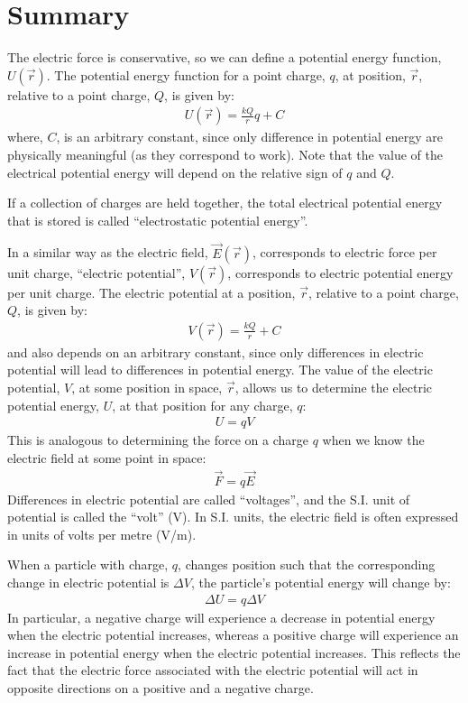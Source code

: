 \newpage
\section{Summary}

\begin{chapterSummary}
The electric force is conservative, so we can define a potential energy function, $U(\vec r)$. The potential energy function for a point charge, $q$, at position, $\vec r$, relative to a point charge, $Q$, is given by:
\begin{align*}
U(\vec r) = \frac{kQ}{r}q + C
\end{align*}
where, $C$, is an arbitrary constant, since only difference in potential energy are physically meaningful (as they correspond to work). Note that the value of the electrical potential energy will depend on the relative sign of $q$ and $Q$. 

If a collection of charges are held together, the total electrical potential energy that is stored is called ``electrostatic potential energy''. 

In a similar way as the electric field, $\vec E(\vec r)$, corresponds to electric force per unit charge, ``electric potential'', $V(\vec r)$, corresponds to electric potential energy per unit charge. The electric potential at a position, $\vec r$, relative to a point charge, $Q$, is given by:
\begin{align*}
V(\vec r) = \frac{kQ}{r} + C
\end{align*}
and also depends on an arbitrary constant, since only differences in electric potential will lead to differences in potential energy. The value of the electric potential, $V$, at some position in space, $\vec r$, allows us to determine the electric potential energy, $U$, at that position for any charge, $q$:
\begin{align*}
U = qV
\end{align*}
This is analogous to determining the force on a charge $q$ when we know the electric field at some point in space:
\begin{align*}
\vec F = q \vec E
\end{align*}
Differences in electric potential are called ``voltages'', and the S.I. unit of potential is called the ``volt'' (V). In S.I. units, the electric field is often expressed in units of volts per metre (V/m).

When a particle with charge, $q$, changes position such that the corresponding change in electric potential is $\Delta V$, the particle's potential energy will change by:
\begin{align*}
\Delta U = q\Delta V
\end{align*}
In particular, a negative charge will experience a decrease in potential energy when the electric potential increases, whereas a positive charge will experience an increase in potential energy when the electric potential increases. This reflects the fact that the electric force associated with the electric potential will act in opposite directions on a positive and a negative charge. 


\end{chapterSummary}
